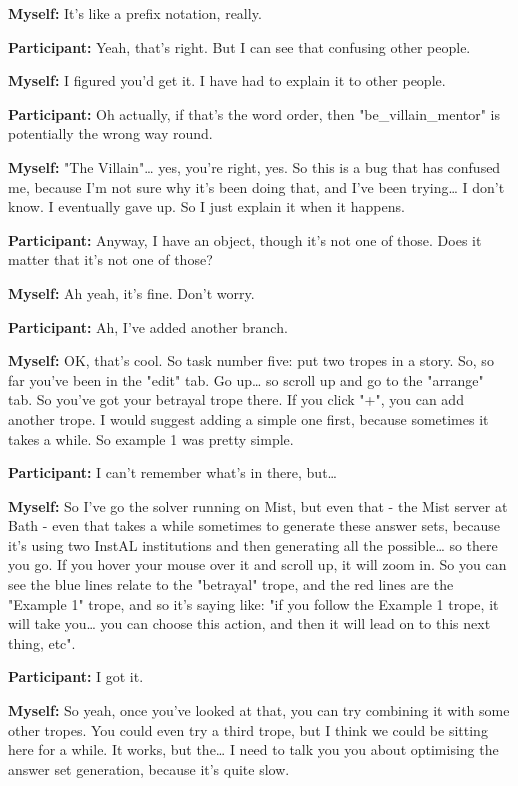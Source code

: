 \documentclass[11pt]{report}
\begin{document}
\begin{linenumbers}
\textbf{Myself:} It's like a prefix notation, really.

\textbf{Participant:} Yeah, that's right. But I can see that confusing other people.

\textbf{Myself:} I figured you'd get it. I have had to explain it to other people.

\textbf{Participant:} Oh actually, if that's the word order, then "be_villain_mentor" is potentially the wrong way round.

\textbf{Myself:} "The Villain"\ldots{} yes, you're right, yes. So this is a bug that has confused me, because I'm not sure why it's been doing that, and I've been trying\ldots{} I don't know. I eventually gave up. So I just explain it when it happens.

\textbf{Participant:} Anyway, I have an object, though it's not one of those. Does it matter that it's not one of those?

\textbf{Myself:} Ah yeah, it's fine. Don't worry.

\textbf{Participant:} Ah, I've added another branch.

\textbf{Myself:} OK, that's cool. So task number five: put two tropes in a story. So, so far you've been in the "edit" tab. Go up\ldots{} so scroll up and go to the "arrange" tab. So you've got your betrayal trope there. If you click "+", you can add another trope. I would suggest adding a simple one first, because sometimes it takes a while. So example 1 was pretty simple.

\textbf{Participant:} I can't remember what's in there, but\ldots{}

\textbf{Myself:} So I've go the solver running on Mist, but even that - the Mist server at Bath - even that takes a while sometimes to generate these answer sets, because it's using two InstAL institutions and then generating all the possible\ldots{} so there you go. If you hover your mouse over it and scroll up, it will zoom in. So you can see the blue lines relate to the "betrayal" trope, and the red lines are the "Example 1" trope, and so it's saying like: "if you follow the Example 1 trope, it will take you\ldots{} you can choose this action, and then it will lead on to this next thing, etc".

\textbf{Participant:} I got it.

\textbf{Myself:} So yeah, once you've looked at that, you can try combining it with some other tropes. You could even try a third trope, but I think we could be sitting here for a while. It works, but the\ldots{} I need to talk you you about optimising the answer set generation, because it's quite slow.


\end{linenumbers}
\end{document}
